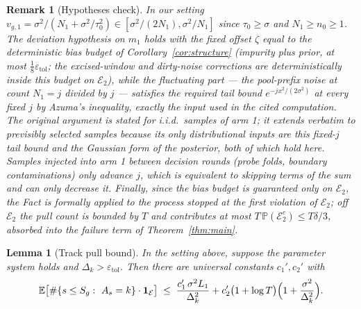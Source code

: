 \documentclass[11pt]{article}
\newtheorem{lemma}{Lemma}
\newtheorem{remark}{Remark}
\newcommand{\Ecal}{\mathcal E}
\newcommand{\E}{\mathbb E}
\newcommand{\Pbb}{\mathbb P}
\newcommand{\one}{\mathbf 1}
\newcommand{\etol}{\varepsilon_{\mathrm{tol}}}
\begin{document}
\begin{remark}[Hypotheses check]
\label{rem:factcheck}
In our setting $v_{g,1}=\sigma^2/(N_1+\sigma^2/\tau_0^2)\in[\sigma^2/(2N_1),\sigma^2/N_1]$ since $\tau_0\ge\sigma$ and $N_1\ge n_0\ge1$. The deviation hypothesis on $m_1$ holds with the \emph{fixed} offset $\zeta$ equal to the deterministic bias budget of Corollary~\ref{cor:structure} (impurity plus prior, at most $\tfrac18\etol$; the excised-window and dirty-noise corrections are deterministically inside this budget on $\Ecal_2$), while the fluctuating part --- the pool-prefix noise at count $N_1=j$ divided by $j$ --- satisfies the required tail bound $e^{-jx^2/(2\sigma^2)}$ at every fixed $j$ by Azuma's inequality, exactly the input used in the cited computation. The original argument is stated for i.i.d.\ samples of arm 1; it extends verbatim to previsibly selected samples because its only distributional inputs are this fixed-$j$ tail bound and the Gaussian form of the posterior, both of which hold here. Samples injected into arm 1 between decision rounds (probe folds, boundary contaminations) only \emph{advance} $j$, which is equivalent to skipping terms of the sum and can only decrease it. Finally, since the bias budget is guaranteed only on $\Ecal_2$, the Fact is formally applied to the process stopped at the first violation of $\Ecal_2$; off $\Ecal_2$ the pull count is bounded by $T$ and contributes at most $T\,\Pbb(\Ecal_2^c)\le T\delta/3$, absorbed into the failure term of Theorem~\ref{thm:main}.
\end{remark}

\begin{lemma}[Track pull bound]
\label{lem:track}
In the setting above, suppose the parameter system holds and $\Delta_k>\etol$. Then there are universal constants $c_1',c_2'$ with
\[
\E\bigl[\#\{s\le S_g:\ A_s=k\}\cdot\one_\Ecal\bigr]
\;\le\;
\frac{c_1'\,\sigma^2L_1}{\Delta_k^2}
+c_2'\bigl(1+\log T\bigr)\Bigl(1+\frac{\sigma^2}{\Delta_k^2}\Bigr).
\]
\end{lemma}
\end{document}
